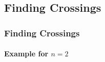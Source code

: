 \documentclass{beamer}
\begin{document}
	\subsection{Finding Crossings}
	\begin{frame}
		\frametitle{Finding Crossings}
		\framesubtitle{Example for $n=2$}
		\begin{center}

\end{center}
\end{frame}
\end{document}
